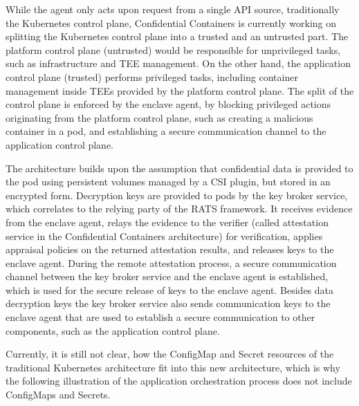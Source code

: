 While the agent only acts upon request from a single API source, traditionally
the Kubernetes control plane, Confidential Containers is currently working on
splitting the Kubernetes control plane into a trusted and an untrusted part. The
platform control plane (untrusted) would be responsible for unprivileged tasks,
such as infrastructure and TEE management. On the other hand, the application
control plane (trusted) performs privileged tasks, including container
management inside TEEs provided by the platform control plane. The split of the
control plane is enforced by the enclave agent, by blocking privileged actions
originating from the platform control plane, such as creating a malicious
container in a pod, and establishing a secure communication channel to the
application control plane.

The architecture builds upon the assumption that confidential data is provided
to the pod using persistent volumes managed by a CSI plugin, but stored in an
encrypted form. Decryption keys are provided to pods by the key broker service,
which correlates to the relying party of the RATS framework. It receives
evidence from the enclave agent, relays the evidence to the verifier (called
attestation service in the Confidential Containers architecture) for
verification, applies appraisal policies on the returned attestation results,
and releases keys to the enclave agent. During the remote attestation process, a
secure communication channel between the key broker service and the enclave
agent is established, which is used for the secure release of keys to the
enclave agent. Besides data decryption keys the key broker service also sends
communication keys to the enclave agent that are used to establish a secure
communication to other components, such as the application control plane.

Currently, it is still not clear, how the ConfigMap and Secret resources of the
traditional Kubernetes architecture fit into this new architecture, which is why
the following illustration of the application orchestration process does not
include ConfigMaps and Secrets.

